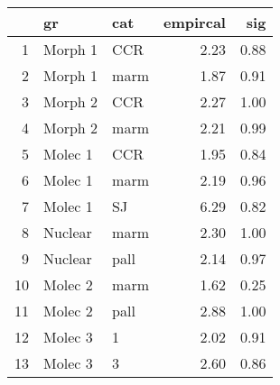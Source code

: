 \begin{table}[ht]
\centering
\begin{tabular}{rllrr}
  \hline
 & gr & cat & empircal & sig \\ 
  \hline
1 & Morph 1 & CCR & 2.23 & 0.88 \\ 
  2 & Morph 1 & marm & 1.87 & 0.91 \\ 
  3 & Morph 2 & CCR & 2.27 & 1.00 \\ 
  4 & Morph 2 & marm & 2.21 & 0.99 \\ 
  5 & Molec 1 & CCR & 1.95 & 0.84 \\ 
  6 & Molec 1 & marm & 2.19 & 0.96 \\ 
  7 & Molec 1 & SJ & 6.29 & 0.82 \\ 
  8 & Nuclear & marm & 2.30 & 1.00 \\ 
  9 & Nuclear & pall & 2.14 & 0.97 \\ 
  10 & Molec 2 & marm & 1.62 & 0.25 \\ 
  11 & Molec 2 & pall & 2.88 & 1.00 \\ 
  12 & Molec 3 & 1 & 2.02 & 0.91 \\ 
  13 & Molec 3 & 3 & 2.60 & 0.86 \\ 
   \hline
\end{tabular}
\label{llmiss}
\end{table}
